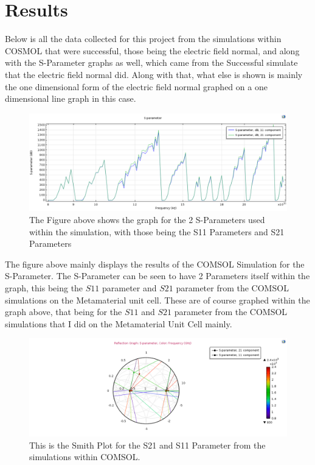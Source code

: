 \documentclass[]{article}
\begin{document}
\section*{Results}
Below is all the data collected for this project from the simulations within COSMOL that were successful, those being the electric field normal, and along with the S-Parameter graphs as well, which came from the Successful simulate that the electric field normal did. Along with that, what else is shown is mainly the one dimensional form of the electric field normal graphed on a one dimensional line graph in this case.
\begin{figure}[H]
	\centering
	\includegraphics[width=\textwidth]{SParameterGraph1D.png}
	\caption{The Figure above shows the graph for the 2 S-Parameters used within the simulation, with those being the S11 Parameters and S21 Parameters}
	\label{test111}
\end{figure}
\noindent
The figure above mainly displays the results of the COMSOL Simulation for the S-Parameter. The S-Parameter can be seen to have 2 Parameters itself within the graph, this being the $S11$ parameter and $S21$ parameter from the COMSOL simulations on the Metamaterial unit cell. These are of course graphed within the graph above, that being for the $S11$ and $S21$ parameter from the COMSOL simulations that I did on the Metamaterial Unit Cell mainly.
\begin{figure}[H]
	\centering
	\includegraphics[width=\textwidth]{SmithPlotforReflection.png}
	\caption{This is the Smith Plot for the S21 and S11 Parameter from the simulations within COMSOL.}
	\label{test1112}
\end{figure}
\end{document}
